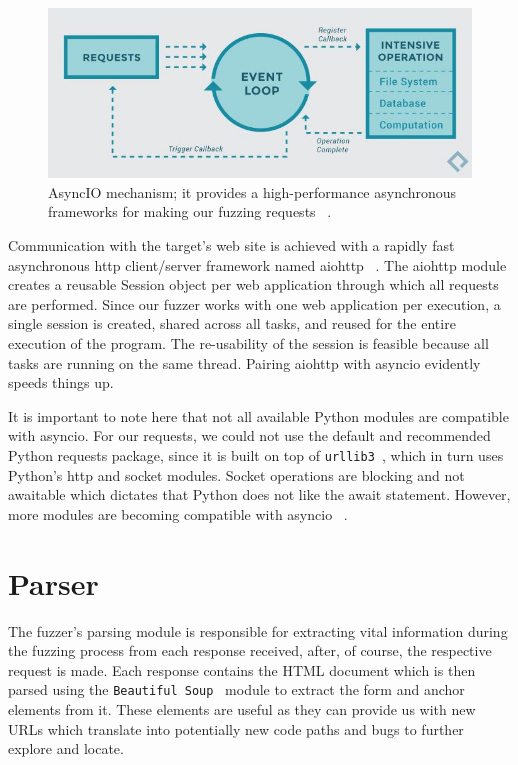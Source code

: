 \begin{figure}[ht]
 \centering
 \captionsetup{justification=centering}
 \includegraphics[width=\linewidth]{figures/asyncio_process.jpg}
 \caption{AsyncIO mechanism; it provides a high-performance asynchronous frameworks for making our fuzzing requests ~\cite{asyncio_image_source}.}
 \label{fig:asyncio_image_source}
\end{figure}

Communication with the target's web site is achieved with a rapidly fast asynchronous http client/server framework named aiohttp ~\cite{aiohttp}. The aiohttp module creates a reusable Session object per web application through which all requests are performed. Since our fuzzer works with one web application per execution, a single session is created, shared across all tasks, and reused for the entire execution of the program. The re-usability of the session is feasible because all tasks are running on the same thread. Pairing aiohttp with asyncio evidently speeds things up.

It is important to note here that not all available Python modules are compatible with asyncio. For our requests, we could not use the default and recommended Python requests package, since it is built on top of {\tt urllib3 }, which in turn uses Python's http and socket modules. Socket operations are blocking and not awaitable which dictates that Python does not like the await statement. However, more modules are becoming compatible with asyncio ~\cite{aiohttp}.

\section{Parser}
The fuzzer's parsing module is responsible for extracting vital information during the fuzzing process from each response received, after, of course, the respective request is made. Each response contains the HTML document which is then parsed using the {\tt  Beautiful Soup}~\cite{beautiful_soup} module to extract the form and anchor elements from it. These elements are useful as they can provide us with new URLs which translate into potentially new code paths and bugs to further explore and locate. 

